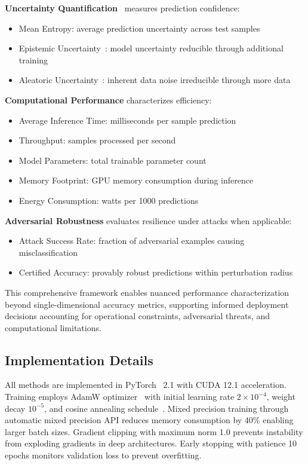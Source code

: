 \textbf{Uncertainty Quantification}~\cite{kendall2017uncertainties} measures prediction confidence:
\begin{itemize}[leftmargin=1.5em]
\item Mean Entropy: average prediction uncertainty across test samples
\item Epistemic Uncertainty~\cite{kendall2017uncertainties}: model uncertainty reducible through additional training
\item Aleatoric Uncertainty~\cite{der2009aleatory}: inherent data noise irreducible through more data
\end{itemize}

\textbf{Computational Performance} characterizes efficiency:
\begin{itemize}[leftmargin=1.5em]
\item Average Inference Time: milliseconds per sample prediction
\item Throughput: samples processed per second
\item Model Parameters: total trainable parameter count
\item Memory Footprint: GPU memory consumption during inference
\item Energy Consumption: watts per 1000 predictions
\end{itemize}

\textbf{Adversarial Robustness} evaluates resilience under attacks when applicable:
\begin{itemize}[leftmargin=1.5em]
\item Attack Success Rate: fraction of adversarial examples causing misclassification
\item Certified Accuracy: provably robust predictions within perturbation radius
\end{itemize}

This comprehensive framework enables nuanced performance characterization beyond single-dimensional accuracy metrics, supporting informed deployment decisions accounting for operational constraints, adversarial threats, and computational limitations.

\subsection{Implementation Details}

All methods are implemented in PyTorch~\cite{paszke2019pytorch} 2.1 with CUDA 12.1 acceleration. Training employs AdamW optimizer~\cite{loshchilov2019decoupled} with initial learning rate $2 \times 10^{-4}$, weight decay $10^{-5}$, and cosine annealing schedule~\cite{loshchilov2017sgdr}. Mixed precision training through automatic mixed precision API reduces memory consumption by 40\% enabling larger batch sizes. Gradient clipping with maximum norm 1.0 prevents instability from exploding gradients in deep architectures. Early stopping with patience 10 epochs monitors validation loss to prevent overfitting.

